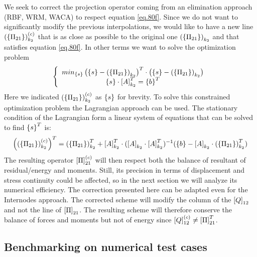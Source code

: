  We seek to correct the projection operator coming from an elimination approach (RBF, WRM, WACA) to respect equation \eqref{eq.80f}. Since we do not want to significantly modify the previous interpolations, we would like to have a new line  $ \left(\left\lbrace{\Pi_{21}}\right \rbrace\right)_{k_2}^{(c)}$ that is as close as possible to the original one  $ \left(\left\lbrace{\Pi_{21}}\right \rbrace\right)_{k_2}$ and that satisfies equation \eqref{eq.80f}. In other terms we want to solve the optimization problem
 \begin{equation}
 \label{eq.80g}
\left\lbrace \begin{array}{c}
 min_{\left\lbrace{s}\right \rbrace}\left(\left\lbrace{s}\right \rbrace-\left(\left\lbrace{\Pi_{21}}\right \rbrace\right)_{k_2} \right)^T\cdot\left(\left\lbrace{s}\right \rbrace-\left(\left\lbrace{\Pi_{21}}\right \rbrace\right)_{k_2} \right)\\
 \left\lbrace{s}\right \rbrace\cdot\left[{A}\right]_{k_2}^T=\left\lbrace{b}\right \rbrace^T
 \end{array} \right.
 \end{equation}
 Here we indicated $ \left(\left\lbrace{\Pi_{21}}\right \rbrace\right)_{k_2}^{(c)}$ as $\left\lbrace{s}\right \rbrace$ for brevity. To solve this constrained optimization problem the Lagrangian approach can be used. The stationary condition of the Lagrangian form a linear system of equations that can be solved to find  $\left\lbrace{s}\right \rbrace^T$ is:
 \begin{equation}
 \label{eq.80h}
\left(\left(\left\lbrace{\Pi_{21}}\right \rbrace\right)_{k_2}^{(c)}\right)^T=\left(\left\lbrace{\Pi_{21}}\right \rbrace\right)_{k_2}^T+\left[{A}\right]_{k_2}^T\cdot(\left[{A}\right]_{k_2}\cdot\left[{A}\right]_{k_2}^T)^{-1}(\left\lbrace{b}\right \rbrace-\left[{A}\right]_{k_2}\cdot\left(\left\lbrace{\Pi_{21}}\right \rbrace\right)_{k_2}^T)
 \end{equation}
 The resulting operator $\left[{\Pi}\right]_{21}^{(c)}$ will then respect both the balance of resultant of residual/energy and moments. Still, its precision in terms of displacement and stress continuity could be affected, so in the next section we will analyze its numerical efficiency. The correction presented here can be adapted even for the Internodes approach. The corrected scheme will modify the column of the $\left[{Q}\right]_{12}$ and not the line of $\left[{\Pi}\right]_{21}$. The resulting scheme will therefore conserve the balance  of forces and moments but not of energy since $\left[{Q}\right]_{12}^{(c)}\neq\left[{\Pi}\right]_{21}^T$.
 \subsection{Benchmarking on numerical test cases}\label{sec4}
